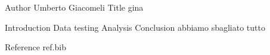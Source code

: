 Author Umberto Giacomeli
Title gina

Introduction
Data testing
Analysis
Conclusion abbiamo sbagliato tutto

Reference
ref.bib
